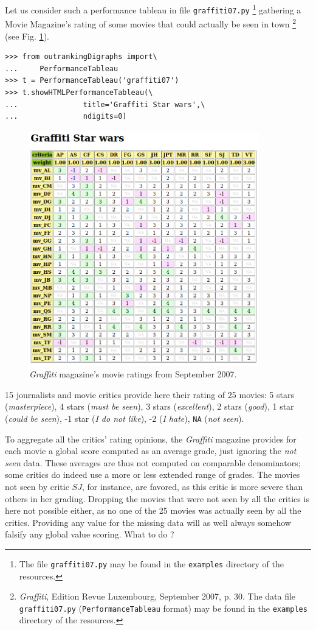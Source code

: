 Let us consider such a performance tableau in file \texttt{graffiti07.py} \footnote{The file \texttt{graffiti07.py} may be found in the \texttt{examples} directory of the \Digraph resources.} gathering a Movie Magazine's rating of some movies that could actually be seen in town \footnote{\emph{Graffiti}, Edition Revue Luxembourg, September 2007, p. 30. The data file \texttt{graffiti07.py} (\texttt{PerformanceTableau} format) may be found in the \texttt{examples} directory of the \Digraph resources.} (see Fig. \ref{fig:16.1}).
\begin{lstlisting}
>>> from outrankingDigraphs import\
...     PerformanceTableau 
>>> t = PerformanceTableau('graffiti07')
>>> t.showHTMLPerformanceTableau(\
...               title='Graffiti Star wars',\
...               ndigits=0)
\end{lstlisting}
\begin{figure}[h]
\includegraphics[width=10cm]{Figures/graffiti07_1.png}
\caption{\emph{Graffiti} magazine's movie ratings from September 2007.}
\label{fig:16.1}       %
\end{figure}
15 journalists and movie critics provide here their rating of 25 movies: 5 stars (\emph{masterpiece}), 4 stars (\emph{must be seen}), 3 stars (\emph{excellent}), 2 stars (\emph{good}), 1 star (\emph{could be seen}), -1 star (\emph{I do not like}), -2 (\emph{I hate}), \texttt{NA} (\emph{not seen}).

To aggregate all the critics' rating opinions, the \emph{Graffiti} magazine provides for each movie a global score computed as an average grade, just ignoring the \emph{not seen} data. These averages are thus not computed on comparable denominators; some critics do indeed use a more or less extended range of grades. The movies not seen by critic $SJ$, for instance, are favored, as this critic is more severe than others in her grading. Dropping the movies that were not seen by all the critics is here not possible either, as no one of the 25 movies was actually seen by all the critics. Providing any value for the missing data will as well always somehow falsify any global value scoring. What to do ?

